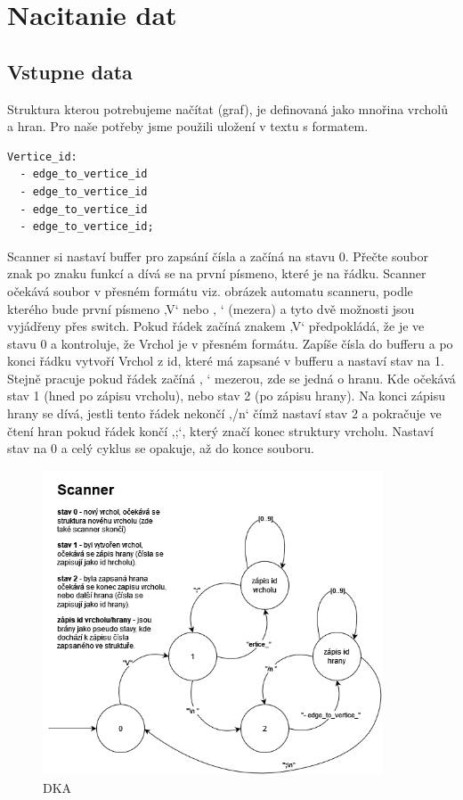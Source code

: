 \section{Nacitanie dat}

\subsection{Vstupne data}
Struktura kterou potrebujeme načítat (graf), je definovaná jako mnořina vrcholů a hran. Pro naše potřeby
jsme použili uložení v textu s formatem.

\begin{lstlisting}
Vertice_id:
  - edge_to_vertice_id
  - edge_to_vertice_id
  - edge_to_vertice_id
  - edge_to_vertice_id;
\end{lstlisting}

Scanner si nastaví buffer pro zapsání čísla a začíná na stavu 0. Přečte soubor znak po znaku funkcí a dívá se na první písmeno, které je na řádku. Scanner očekává soubor v přesném formátu viz. obrázek automatu scanneru, podle kterého bude první písmeno ‚V‘ nebo ‚ ‘ (mezera) a tyto dvě možnosti jsou vyjádřeny přes switch. Pokud řádek začíná znakem ‚V‘ předpokládá, že je ve stavu 0 a kontroluje, že Vrchol je v přesném formátu. Zapíše čísla do bufferu a po konci řádku vytvoří Vrchol z id, které má zapsané v bufferu a nastaví stav na 1. Stejně pracuje pokud řádek začíná ‚ ‘ mezerou, zde se jedná o hranu. Kde očekává stav 1 (hned po zápisu vrcholu), nebo stav 2 (po zápisu hrany). Na konci zápisu hrany se dívá, jestli tento řádek nekončí ‚/n‘ čímž nastaví stav 2 a pokračuje ve čtení hran pokud řádek končí ‚;‘, který značí konec struktury vrcholu. Nastaví stav na 0 a celý cyklus se opakuje, až do konce souboru.

\begin{figure}[h]
    \centering
    \includegraphics[width=0.9\textwidth]{doc/fig/Scanner_automat_Final.drawio.png}
    \caption{DKA}
    \label{fig:DKA}
\end{figure}


\newpage
